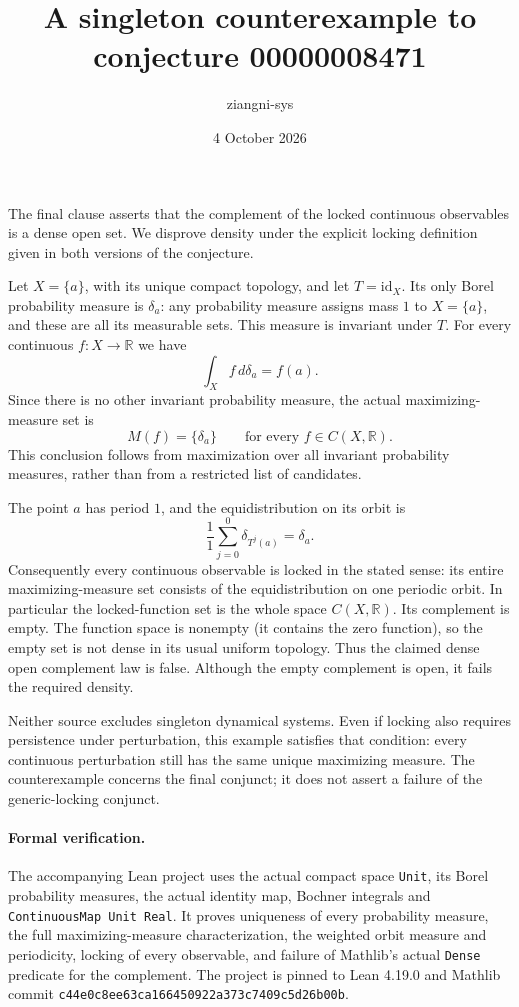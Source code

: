 \documentclass[11pt]{article}
\title{A singleton counterexample to conjecture 00000008471}
\author{ziangni-sys}
\date{4 October 2026}
\begin{document}
\maketitle
The final clause asserts that the complement of the locked continuous
observables is a dense open set. We disprove density under the explicit
locking definition given in both versions of the conjecture.

Let $X=\{a\}$, with its unique compact topology, and let $T=\mathrm{id}_X$.
Its only Borel probability measure is $\delta_a$: any probability measure
assigns mass $1$ to $X=\{a\}$, and these are all its measurable sets.
This measure is invariant under $T$. For every continuous
$f:X\to\mathbb R$ we have
\[
\int_X f\,d\delta_a=f(a).
\]
Since there is no other invariant probability measure, the actual
maximizing-measure set is
\[
M(f)=\{\delta_a\}\qquad\text{for every }f\in C(X,\mathbb R).
\]
This conclusion follows from maximization over all invariant probability
measures, rather than from a restricted list of candidates.

The point $a$ has period $1$, and the equidistribution on its orbit is
\[
\frac1{1}\sum_{j=0}^{0}\delta_{T^j(a)}=\delta_a.
\]
Consequently every continuous observable is locked in the stated sense:
its entire maximizing-measure set consists of the equidistribution on
one periodic orbit. In particular the locked-function set is the whole
space $C(X,\mathbb R)$. Its complement is empty. The function space is
nonempty (it contains the zero function), so the empty set is not dense
in its usual uniform topology. Thus the claimed dense open complement
law is false. Although the empty complement is open, it fails the
required density.

Neither source excludes singleton dynamical systems. Even if locking
also requires persistence under perturbation, this example satisfies
that condition: every continuous perturbation still has the same unique
maximizing measure. The counterexample concerns the final conjunct;
it does not assert a failure of the generic-locking conjunct.

\paragraph{Formal verification.}
The accompanying Lean project uses the actual compact space
\texttt{Unit}, its Borel probability measures, the actual identity
map, Bochner integrals and \texttt{ContinuousMap Unit Real}. It proves
uniqueness of every probability measure, the full maximizing-measure
characterization, the weighted orbit measure and periodicity, locking
of every observable, and failure of Mathlib's actual \texttt{Dense}
predicate for the complement. The project is pinned to Lean 4.19.0 and
Mathlib commit \texttt{c44e0c8ee63ca166450922a373c7409c5d26b00b}.
\end{document}

